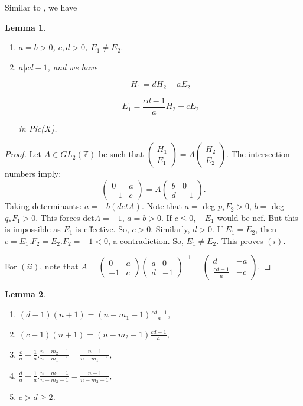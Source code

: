 \documentclass{article}
\newtheorem{lemma}{Lemma}[section]
\begin{document}
Similar to \cite{li2021projective}, we have
\begin{lemma}\label{lemma:duoli}
    \begin{enumerate}
        \item [(i)] $a=b>0$, $c,d>0$, $E_1\neq E_2$.
        \item [(ii)] $a|cd-1$, and we have

        $$H_1=dH_2-aE_2$$

        $$E_1=\frac{cd-1}{a}H_2-cE_2$$

        in Pic($X$).
    \end{enumerate}
\end{lemma}
\begin{proof}
Let $A\in GL_2(\mathbb{Z})$ be such that $\begin{pmatrix}
    H_1 \\
    E_1
\end{pmatrix}=A \begin{pmatrix}
    H_2 \\
    E_2
\end{pmatrix}$. The intersection numbers imply: $$\begin{pmatrix}
    0 & a \\
    -1 & c
\end{pmatrix}=A \begin{pmatrix}
    b & 0 \\
    d & -1
\end{pmatrix}.$$
Taking determinants: $a=-b(detA)$. Note that $a=$ deg $p_*F_2>0$, $b=$ deg $q_*F_1>0$. This forces det$A=-1$, $a=b>0$. If $c\leq0$, $-E_1$ would be nef. But this is impossible as $E_1$ is effective. So, $c>0$. Similarly, $d>0$. If $E_1=E_2$, then $c=E_1.F_2=E_2.F_2=-1<0$, a contradiction. So, $E_1\neq E_2$. This proves $(i)$.

For $(ii)$, note that $A=\begin{pmatrix}
    0 & a \\
    -1 & c
\end{pmatrix} \begin{pmatrix}
    a & 0 \\
    d & -1
\end{pmatrix}^{-1}=\begin{pmatrix}
    d & -a \\
    \frac{cd-1}{a} & -c
\end{pmatrix}$.
\end{proof}
\begin{lemma}\label{lemma:katz}
    \begin{enumerate}
        \item [(i)] $(d-1)(n+1)=(n-m_1-1)\frac{cd-1}{a}$,
        \item [(ii)] $(c-1)(n+1)=(n-m_2-1)\frac{cd-1}{a}$,
        \item [(iii)] $\frac{c}{a}+\frac{1}{a}. \frac{n-m_2-1}{n-m_1-1}=\frac{n+1}{n-m_1-1}$,
        \item [(iv)]$\frac{d}{a}+\frac{1}{a} .\frac{n-m_1-1}{n-m_2-1}=\frac{n+1}{n-m_2-1}$,
        \item [(v)]$c>d\geq 2$.
    \end{enumerate}
\end{lemma}
\end{document}
